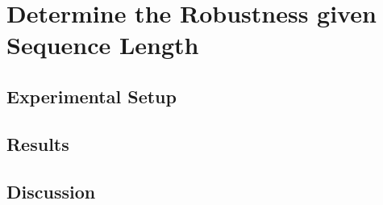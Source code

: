 \documentclass[./../../paper.tex]{subfiles}
\begin{document}
\section{Determine the Robustness given Sequence Length}

\subsection{Experimental Setup}

\subsection{Results}

\subsection{Discussion}
\end{document}
